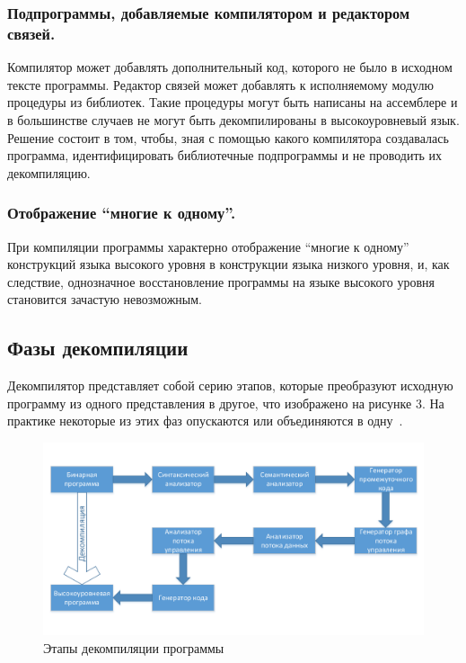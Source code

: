 \subsubsection*{Подпрограммы, добавляемые компилятором и редактором связей.}
Компилятор может добавлять дополнительный код, которого не было в исходном тексте программы. Редактор связей может добавлять к исполняемому модулю процедуры из библиотек. Такие процедуры могут быть написаны на ассемблере и в большинстве случаев не могут быть декомпилированы в высокоуровневый язык. Решение состоит в том, чтобы, зная с помощью какого компилятора создавалась программа, идентифицировать библиотечные подпрограммы и не проводить их декомпиляцию.
\subsubsection*{Отображение ``многие к одному''.}
При компиляции программы характерно отображение ``многие к одному'' конструкций языка высокого уровня в конструкции языка низкого уровня, и, как следствие, однозначное восстановление программы на языке высокого уровня становится зачастую невозможным.

\subsection{Фазы декомпиляции}

Декомпилятор представляет собой серию этапов, которые преобразуют исходную программу из одного представления в другое, что изображено на рисунке 3. На практике некоторые из этих фаз опускаются или объединяются в одну~\cite{sheglov}.

\begin{figure}[H]
\includegraphics[width=1\linewidth]{Zabransky/work.pdf}   
\caption{Этапы декомпиляции программы}
\end{figure}

